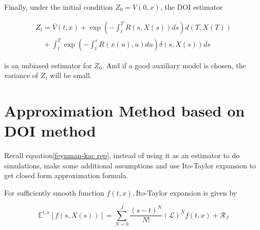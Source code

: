 Finally, under the initial condition $Z_0 = V(0,x)$, the DOI estimator

\begin{equation}
    \begin{gathered}
        Z_t =\bar{V}(t, x)+\exp \left(-\int_{t}^{T} R(s,X(s)) d s\right) d(T,X(T)) \\
        \quad+\int_{t}^{T} \exp \left(-\int_{t}^{s} R(x(u), u) d u\right) \delta(s,X(s))d s
        \end{gathered}
\end{equation}

\noindent is an unbiased estimator for $Z_0$. And if a good auxiliary model is chosen,  the variance of $Z_t$ will be small.








\section{Approximation Method based on DOI method}
\label{sec: 2.2}

Recall equation\eqref{feynman-kac rep}, instead of using it as an estimator to do simulations, \cite{kristensen_adding_2011} make some additional assumptions and use Ito-Taylor expansion to get closed form approximation formula.

For sufficiently smooth function $f(t,x), $Ito-Taylor expansion is given by

\begin{equation}
    \mathbb{E}^{t, x}[f(s, X(s))]=\sum_{N=0}^{J} \frac{(s-t)^{N}}{N !}\left(\mathcal{L}\right)^{N} f(t, x)+\mathcal{R}_{J}
\end{equation}

